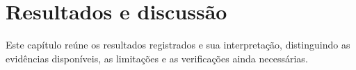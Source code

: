 \chapter{Resultados e discussão}\label{cap:resultados_discussao}
Este capítulo reúne os resultados registrados e sua interpretação, distinguindo
as evidências disponíveis, as limitações e as verificações ainda necessárias.
